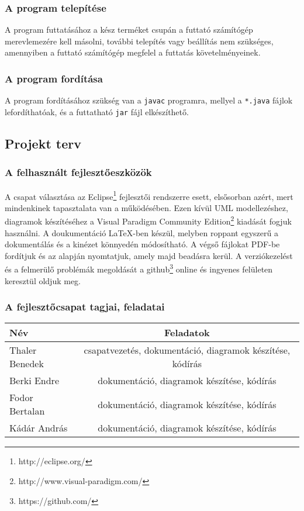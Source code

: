     \subsubsection{A program telepítése}
A program futtatásához a kész terméket csupán a futtató számítógép merevlemezére kell másolni, további telepítés vagy beállítás nem szükséges, amennyiben a futtató számítógép megfelel a futtatás követelményeinek.

    \subsubsection{A program fordítása}
A program fordításához szükség van a \texttt{javac} programra, mellyel a \texttt{*.java} fájlok lefordíthatóak, és a futtatható \texttt{jar} fájl elkészíthető.
    
\subsection{Projekt terv}

    \subsubsection{A felhasznált fejlesztőeszközök}
	A csapat választása az Eclipse\footnote{http://eclipse.org/} fejlesztői rendszerre esett, elsősorban azért, mert mindenkinek tapasztalata van a működésében. Ezen kívül UML modellezéshez, diagramok készítéséhez a Visual Paradigm Community Edition\footnote{http://www.visual-paradigm.com/} kiadását fogjuk használni.
A doukumentáció \LaTeX -ben készül, melyben roppant egyszerű a dokumentálás és a kinézet könnyedén módosítható. A végső fájlokat PDF-be fordítjuk és az alapján nyomtatjuk, amely majd beadásra kerül. A verziókezelést és a felmerülő problémák megoldását a github\footnote{https://github.com/} online és ingyenes felületen keresztül oldjuk meg.

    \subsubsection{A fejlesztőcsapat tagjai, feladatai}
	\begin{center}
	\begin{tabular} {| l | c | }
		\hline
		Név & Feladatok\\
		\hline
		Thaler Benedek & csapatvezetés, dokumentáció, diagramok készítése, kódírás \\ 
		\hline
		Berki Endre & dokumentáció, diagramok készítése, kódírás \\
		\hline
		Fodor Bertalan & dokumentáció, diagramok készítése, kódírás \\
		\hline
		Kádár András & dokumentáció, diagramok készítése, kódírás \\
		\hline
	\end{tabular}
	\end{center}

